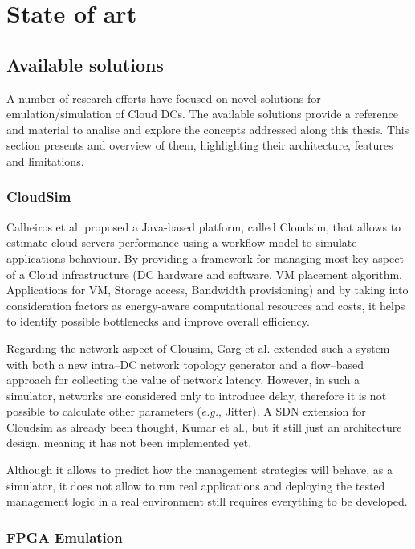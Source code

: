 \documentclass[12pt,english,oneside]{book}
\begin{document}
\chapter{State of art \label{cha:stateofart} }

\section{Available solutions}

A number of research efforts have focused on novel solutions for emulation/simulation of Cloud DCs.
The available solutions provide a reference and material to analise and explore the concepts addressed along this thesis. 
This section presents and overview of them, highlighting their architecture, features and limitations.

\subsection{CloudSim}
\hspace{0.6cm}

Calheiros et al.\cite{cloudsim} proposed a Java-based platform, called Cloudsim, that allows to estimate cloud servers performance using a workflow model to simulate applications behaviour.
By providing a framework for managing most key aspect of a Cloud infrastructure (DC hardware and software, VM placement algorithm, Applications for VM, Storage access, Bandwidth provisioning) and by taking into consideration factors as energy-aware computational resources and costs, it helps to identify possible bottlenecks and improve overall efficiency.

Regarding the network aspect of Clousim, Garg et al.\cite{cloudsim2} extended such a system with both a new intra--DC network topology generator and a flow--based approach for collecting the value of network latency. However, in such a simulator, networks are considered only to introduce delay, therefore it is not possible to calculate other parameters (\textit{e.g.}, Jitter).
A SDN extension for Cloudsim as already been thought, Kumar et al.\cite{cloudsim3}, but it still just an architecture design, meaning it has not been implemented yet.

Although it allows to predict how the management strategies will behave, as a simulator, it does not allow to run real applications and deploying the tested management logic in a real environment still requires everything to be developed.

\subsection{FPGA Emulation}
\hspace{0.6cm}
\end{document}
